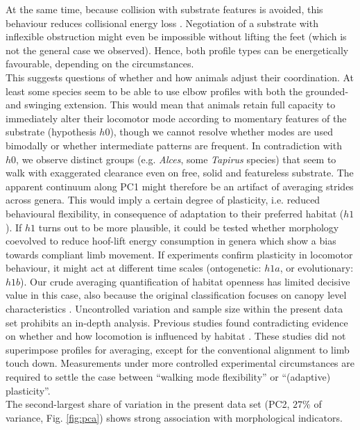 At the same time, because collision with substrate features is avoided, this behaviour reduces collisional energy loss \citep[i.e. loss from collision with superficial vegetation or rubble, which has to be distinguished from the collisional models in][]{Ruina2005}.
Negotiation of a substrate with inflexible obstruction might even be impossible without lifting the feet (which is not the general case we observed).
Hence, both profile types can be energetically favourable, depending on the circumstances.
\\This suggests questions of whether and how animals adjust their coordination.
At least some species seem to be able to use elbow profiles with both the grounded- and swinging extension.
This would mean that animals retain full capacity to immediately alter their locomotor mode according to momentary features of the substrate (hypothesis $h0$), though we cannot resolve whether modes are used bimodally or whether intermediate patterns are frequent.
In contradiction with $h0$, we observe distinct groups (e.g. \textit{Alces}, some \textit{Tapirus} species) that seem to walk with exaggerated clearance even on free, solid and featureless substrate.
The apparent continuum along PC1 might therefore be an artifact of averaging strides across genera.
This would imply a certain degree of plasticity, i.e. reduced behavioural flexibility, in consequence of adaptation to their preferred habitat ($h1$).
If $h1$ turns out to be more plausible, it could be tested whether morphology coevolved to reduce hoof-lift energy consumption in genera which show a bias towards compliant limb movement.
If experiments confirm plasticity in locomotor behaviour, it might act at different time scales (ontogenetic: $h1a$, or evolutionary: $h1b$).
Our crude averaging quantification of habitat openness has limited decisive value in this case, also because the original classification focuses on canopy level characteristics \citep{Stankowich2009}.
Uncontrolled variation and sample size within the present data set prohibits an in-depth analysis.
Previous studies found contradicting evidence on whether and how locomotion is influenced by habitat \citep[][]{Stoessel2012,Fuller2011,Arnold1983,Schulte2004,Druelle2019}.
These studies did not superimpose profiles for averaging, except for the conventional alignment to limb touch down.
Measurements under more controlled experimental circumstances are required to settle the case between ``walking mode flexibility'' or ``(adaptive) plasticity''.
\smallskip\\The second-largest share of variation in the present data set (PC2, $27\%$ of variance, Fig. \ref{fig:pca}) shows strong association with morphological indicators.
